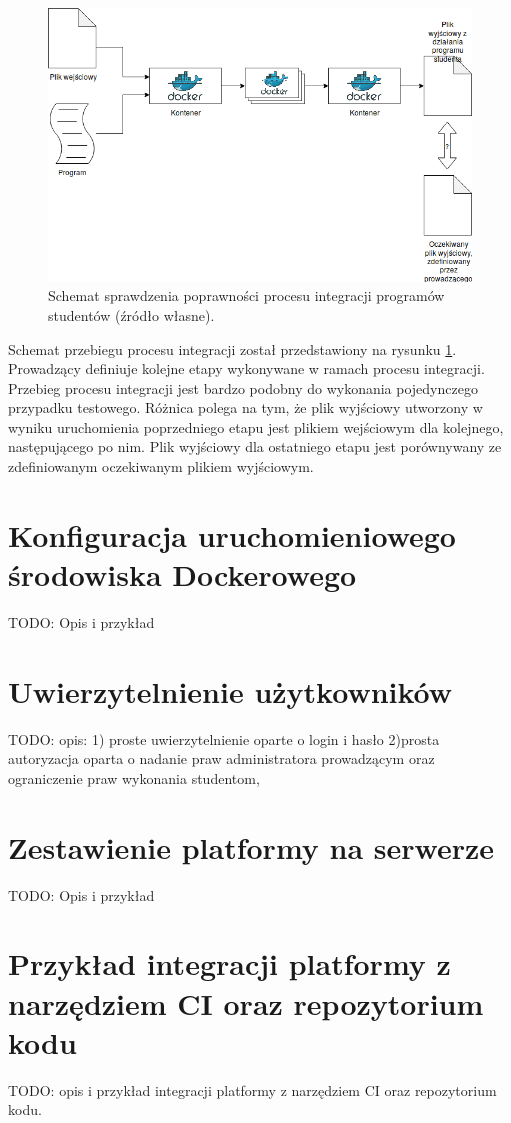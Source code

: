 \begin{figure}[h]
    \centering
    \includegraphics[width = 13cm]{chapter02/integration.png}
    \caption{Schemat sprawdzenia poprawności procesu integracji programów studentów (źródło własne).}
    \label{fig:integration}
\end{figure}

Schemat przebiegu procesu integracji został przedstawiony na rysunku \ref{fig:integration}.
Prowadzący definiuje kolejne etapy wykonywane w ramach procesu integracji.
Przebieg procesu integracji jest bardzo podobny do wykonania pojedynczego przypadku testowego.
Różnica polega na tym, że plik wyjściowy utworzony w wyniku uruchomienia poprzedniego etapu jest plikiem wejściowym dla kolejnego, następującego po nim.
Plik wyjściowy dla ostatniego etapu jest porównywany ze zdefiniowanym oczekiwanym plikiem wyjściowym.

\section {Konfiguracja uruchomieniowego środowiska Dockerowego}

TODO: Opis i przykład

\section {Uwierzytelnienie użytkowników}
\label{authorization}

TODO: opis:
1) proste uwierzytelnienie oparte o login i hasło
2)prosta autoryzacja oparta o nadanie praw administratora prowadzącym
oraz ograniczenie praw wykonania studentom,

\section {Zestawienie platformy na serwerze}
\label{run-platform}

TODO: Opis i przykład

\section {Przykład integracji platformy z narzędziem CI oraz repozytorium kodu}
\label{ci-integration}

TODO: opis i przykład integracji platformy z narzędziem CI oraz repozytorium
kodu.
